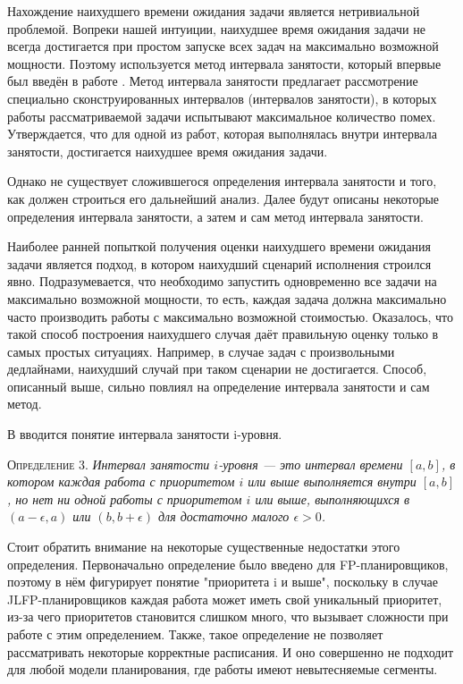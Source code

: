 \documentclass[14pt]{matmex-diploma-custom}
\begin{document}
Нахождение наихудшего времени ожидания задачи является нетривиальной проблемой. Вопреки нашей 
  интуиции, наихудшее время ожидания задачи не всегда достигается при простом запуске 
  всех задач на максимально возможной мощности. Поэтому используется метод интервала занятости, который впервые был 
  введён в работе \cite{Lehoczky1990FixedPS}. Метод интервала занятости предлагает 
  рассмотрение специально сконструированных интервалов (интервалов занятости), в 
  которых работы рассматриваемой задачи испытывают максимальное количество помех. 
  Утверждается, что для одной из работ, которая выполнялась внутри интервала занятости, 
  достигается наихудшее время ожидания задачи.
  
Однако не существует сложившегося определения интервала занятости и того, как должен 
  строиться его дальнейший анализ. Далее будут описаны некоторые определения 
  интервала занятости, а затем и сам метод интервала занятости.

Наиболее ранней попыткой получения оценки наихудшего времени ожидания задачи
  является подход, в котором наихудший сценарий исполнения строился явно.
  Подразумевается, что необходимо запустить одновременно все задачи на максимально возможной мощности, 
  то есть, каждая задача должна максимально часто производить работы с максимально 
  возможной стоимостью. Оказалось, что такой способ построения наихудшего случая 
  даёт правильную оценку только в самых простых ситуациях. Например, в случае задач 
  с произвольными дедлайнами, наихудший случай при таком сценарии не достигается.
  Способ, описанный выше, сильно повлиял на определение интервала занятости 
  и сам метод.

В \cite{Lehoczky1990FixedPS} вводится понятие интервала занятости i-уровня.

\textsc{Определение 3.}
\textit{Интервал занятости $i$-уровня --- это интервал времени $[a,b]$, в котором каждая 
  работа с приоритетом $i$ или выше выполняется внутри $[a,b]$, но нет ни одной работы
  с приоритетом $i$ или выше, выполняющихся в $(a - \epsilon, a)$ или $(b, b + \epsilon)$ 
  для достаточно малого $\epsilon > 0$.
}  

Стоит обратить внимание на некоторые существенные недостатки этого определения. 
  Первоначально определение было введено для FP-планировщиков, поэтому 
  в нём фигурирует понятие "приоритета i и выше", поскольку в случае JLFP-планировщиков каждая 
  работа может иметь свой уникальный приоритет, из-за чего приоритетов становится 
  слишком много, что вызывает сложности при работе с этим определением. Также, такое 
  определение не позволяет рассматривать некоторые корректные расписания. И оно совершенно 
  не подходит для любой модели планирования, где работы имеют невытесняемые сегменты.
\end{document}
